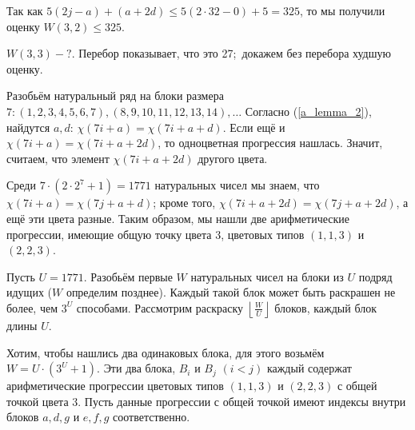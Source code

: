 \documentclass[a4paper]{report}
\begin{document}
{{            Так как $5(2j - a) + (a + 2d) \le 5(2 \cdot 32 - 0) + 5 = 325$, то мы получили оценку $W(3, 2) \le 325$.

            \item $W(3, 3) - ?$. Перебор показывает, что это 27;\ докажем без перебора худшую оценку.

            Разобьём натуральный ряд на блоки размера $7: (1, 2, 3, 4, 5, 6, 7), (8, 9, 10, 11, 12, 13, 14), \ldots$
            Согласно (\ref{a_lemma_2}), найдутся $a, d$: $\chi(7i + a) = \chi(7i + a + d)$.
            Если ещё и $\chi(7i + a) = \chi(7i + a + 2d)$, то одноцветная прогрессия нашлась.
            Значит, считаем, что элемент $\chi(7i + a + 2d)$ другого цвета.

            Среди $7 \cdot (2 \cdot 2^7 + 1) = 1771$ натуральных чисел мы знаем, что $\chi(7i + a) = \chi(7j + a + d)$;
            кроме того, $\chi(7i + a + 2d) = \chi(7j + a + 2d)$, а ещё эти цвета разные.
            Таким образом, мы нашли две арифметические прогрессии, имеющие общую точку цвета $3$, цветовых типов $(1,1,3)$ и $(2,2,3)$.

            Пусть $U = 1771$. Разобьём первые $W$ натуральных чисел на блоки из $U$ подряд идущих ($W$ определим позднее).
            Каждый такой блок может быть раскрашен не более, чем $3^U$ способами.
            Рассмотрим раскраску $\left\lfloor \frac{W}{U} \right\rfloor$ блоков, каждый блок длины $U$.

            Хотим, чтобы нашлись два одинаковых блока, для этого возьмём $W = U \cdot (3^U + 1)$.
            Эти два блока, $B_i$ и $B_j$ $(i < j)$ каждый содержат арифметические прогрессии цветовых типов $(1,1,3)$ и $(2,2,3)$ с общей точкой цвета $3$.
            Пусть данные прогрессии с общей точкой имеют индексы внутри блоков $a, d, g$ и $e, f, g$ соответственно.

}}
\end{document}
